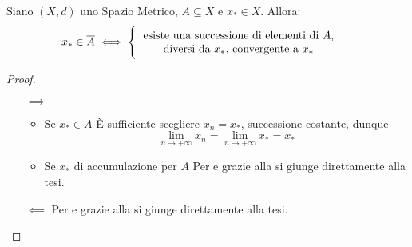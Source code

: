 \begin{corollary}
	\label{coro:succ_conv_sse_x_in_chius_A}
	Siano $(X,d)$ uno Spazio Metrico, $A \subseteq X$ e $x_* \in X$. Allora:
	\[x_* \in \overline{A} \iff
	\begin{cases}
		\begin{tabular}{c} %
			esiste una successione di elementi di $A$,\\[-.5ex]
			diversi da $x_*$, convergente a $x_*$
		\end{tabular}
	\end{cases}\]
	\begin{proof}~
		\begin{itemize}
			\item[$\implies$]
				\begin{itemize}
					\item Se $x_* \in A$\newline
						È sufficiente scegliere $x_n = x_*$, successione costante, dunque
						\[\lim\limits_{n \to +\infty} x_n = \lim\limits_{n \to +\infty} x_* = x_*\]
					\item Se $x_*$ di accumulazione per $A$\newline
						Per  e grazie alla  si giunge direttamente alla tesi.
				\end{itemize}
			\item[$\impliedby$] Per  e grazie alla  si giunge direttamente alla tesi.
		\end{itemize}
	\end{proof}
\end{corollary}

